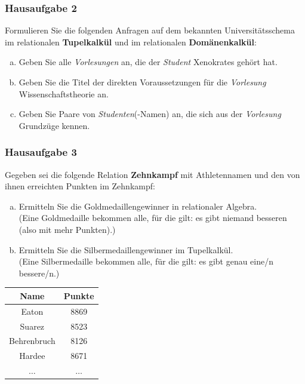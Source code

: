\begin{frame}
	\frametitle{Hausaufgabe 2}
	\vspace{0.25cm}

	Formulieren Sie die folgenden Anfragen auf dem bekannten Universitätsschema im
	relationalen \textbf{Tupelkalkül} und im relationalen \textbf{Domänenkalkül}:
	\begin{enumerate}[a)]
		\item Geben Sie alle \textit{Vorlesungen} an, die der \textit{Student} Xenokrates gehört hat.
		\item Geben Sie die Titel der direkten Voraussetzungen für die \textit{Vorlesung} Wissenschaftstheorie an.
		\item Geben Sie Paare von \textit{Studenten}(-Namen) an, die sich aus der \textit{Vorlesung} Grundzüge kennen.
	\end{enumerate}
\end{frame}

\begin{frame}
	\frametitle{Hausaufgabe 3}
	\vspace{0.25cm}

	Gegeben sei die folgende Relation \textbf{Zehnkampf} mit Athletennamen und den von ihnen erreichten Punkten im Zehnkampf:

	\begin{enumerate}[a)]
		\item Ermitteln Sie die Goldmedaillengewinner in relationaler Algebra. \\
		      (Eine Goldmedaille bekommen alle, für die gilt: es gibt niemand besseren (also mit mehr Punkten).)
		\item Ermitteln Sie die Silbermedaillengewinner im Tupelkalkül. \\
		      (Eine Silbermedaille bekommen alle, für die gilt: es gibt genau eine/n bessere/n.)
	\end{enumerate}
	\begin{table}[]
		\begin{tabular}{c|c}
			Name         & Punkte       \\ \hline
			Eaton        & 8869         \\
			Suarez       & 8523         \\
			Behrenbruch  & 8126         \\
			Hardee       & 8671         \\
			\( \hdots \) & \( \hdots \)
		\end{tabular}
	\end{table}
\end{frame}

